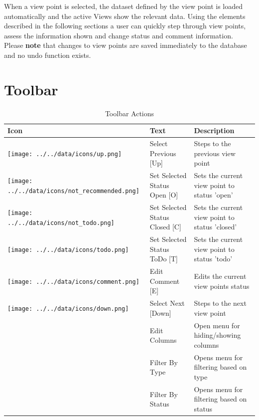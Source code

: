 When a view point is selected, the dataset defined by the view point is loaded automatically and the active Views show the relevant data. Using the elements described in the following sections a user can quickly step through view points, assess the information shown and change status and comment information. \\

Please \textbf{note} that changes to view points are saved immediately to the database and no undo function exists.

\section{Toolbar}

\begin{table}[H]
  \center
  \begin{tabular}{ | l | l | l |}
    \hline
    \textbf{Icon} & \textbf{Text} &  \textbf{Description} \\ \hline
    \texttt{[image: ../../data/icons/up.png]} & Select Previous [Up] & Steps to the previous view point \\ \hline
    \texttt{[image: ../../data/icons/not\_recommended.png]} & Set Selected Status Open [O] & Sets the current view point to status 'open' \\ \hline
    \texttt{[image: ../../data/icons/not\_todo.png]} & Set Selected Status Closed [C] & Sets the current view point to status 'closed' \\ \hline
    \texttt{[image: ../../data/icons/todo.png]} & Set Selected Status ToDo [T] & Sets the current view point to status 'todo' \\ \hline
    \texttt{[image: ../../data/icons/comment.png]} & Edit Comment [E] & Edits the current view points status \\ \hline
    \texttt{[image: ../../data/icons/down.png]} & Select Next [Down] & Steps to the next view point \\ \hline
    & Edit Columns & Open menu for hiding/showing columns \\ \hline
    & Filter By Type & Opens menu for filtering based on type \\ \hline
    & Filter By Status & Opens menu for filtering based on status \\ \hline
  \end{tabular}
  \caption{Toolbar Actions}
\end{table}
\ \\

